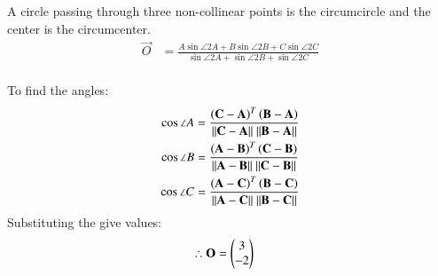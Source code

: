 \solution A circle passing through three non-collinear points is the circumcircle and the center is the circumcenter.\\
\begin{align}
\vec{O} &= \frac{A\sin{\angle 2A} + B\sin{\angle 2B} + C\sin{\angle 2C}}{\sin{\angle 2A} + \sin{\angle 2B} + \sin{\angle 2C}}
\end{align}\\
To find the angles:
\begin{align}
\cos{\angle A} &= \frac{ \left(\mathbf{C}-\mathbf{A}\right)^T \left(\mathbf{B}-\mathbf{A}\right)}{\| \mathbf{C}-\mathbf{A} \|\ \| \mathbf{B}-\mathbf{A} \|} \\
\cos{\angle B} &= \frac{ \left(\mathbf{A}-\mathbf{B}\right)^T \left(\mathbf{C}-\mathbf{B}\right)}{\| \mathbf{A}-\mathbf{B} \|\ \| \mathbf{C}-\mathbf{B} \|} \\
\cos{\angle C} &= \frac{ \left(\mathbf{A}-\mathbf{C}\right)^T \left(\mathbf{B}-\mathbf{C}\right)}{\| \mathbf{A}-\mathbf{C} \|\ \| \mathbf{B}-\mathbf{C} \|} 
\end{align}
Substituting the give values:
\begin{align}
\therefore \mathbf{O} &= \begin{pmatrix}3\\-2\end{pmatrix}
\end{align}






